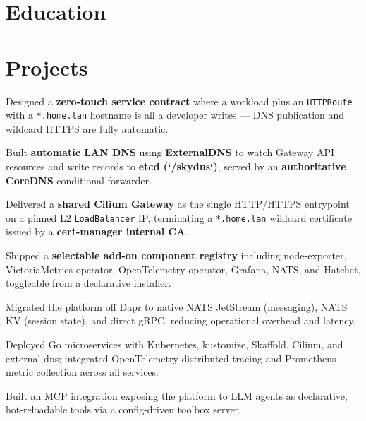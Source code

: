 \documentclass[10pt,a4paper]{resume}
\begin{document}
\section{Education}

\vspace{2pt}

\section{Projects}

\bullets
  \item Designed a \textbf{zero-touch service contract} where a workload plus an \texttt{HTTPRoute} with a \texttt{*.home.lan} hostname is all a developer writes — DNS publication and wildcard HTTPS are fully automatic.
  \item Built \textbf{automatic LAN DNS} using \textbf{ExternalDNS} to watch Gateway API resources and write records to \textbf{etcd (`/skydns`)}, served by an \textbf{authoritative CoreDNS} conditional forwarder.
  \item Delivered a \textbf{shared Cilium Gateway} as the single HTTP/HTTPS entrypoint on a pinned L2 \texttt{LoadBalancer} IP, terminating a \texttt{*.home.lan} wildcard certificate issued by a \textbf{cert-manager internal CA}.
  \item Shipped a \textbf{selectable add-on component registry} including node-exporter, VictoriaMetrics operator, OpenTelemetry operator, Grafana, NATS, and Hatchet, toggleable from a declarative installer.
\bulletsend
\vspace{1.0pt}
\bullets
  \item Migrated the platform off Dapr to native NATS JetStream (messaging), NATS KV (session state), and direct gRPC, reducing operational overhead and latency.
  \item Deployed Go microservices with Kubernetes, kustomize, Skaffold, Cilium, and external-dns; integrated OpenTelemetry distributed tracing and Prometheus metric collection across all services.
  \item Built an MCP integration exposing the platform to LLM agents as declarative, hot-reloadable tools via a config-driven toolbox server.
\bulletsend
\end{document}
